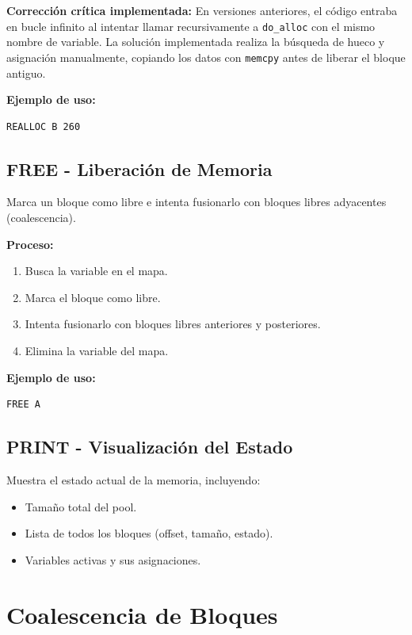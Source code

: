 \documentclass[12pt,a4paper]{article}
\begin{document}
\textbf{Corrección crítica implementada:}
En versiones anteriores, el código entraba en bucle infinito al intentar llamar recursivamente a \texttt{do\_alloc} con el mismo nombre de variable. La solución implementada realiza la búsqueda de hueco y asignación manualmente, copiando los datos con \texttt{memcpy} antes de liberar el bloque antiguo.

\textbf{Ejemplo de uso:}
\begin{lstlisting}
REALLOC B 260
\end{lstlisting}

\subsection{FREE - Liberación de Memoria}

Marca un bloque como libre e intenta fusionarlo con bloques libres adyacentes (coalescencia).

\textbf{Proceso:}
\begin{enumerate}
    \item Busca la variable en el mapa.
    \item Marca el bloque como libre.
    \item Intenta fusionarlo con bloques libres anteriores y posteriores.
    \item Elimina la variable del mapa.
\end{enumerate}

\textbf{Ejemplo de uso:}
\begin{lstlisting}
FREE A
\end{lstlisting}

\subsection{PRINT - Visualización del Estado}

Muestra el estado actual de la memoria, incluyendo:
\begin{itemize}
    \item Tamaño total del pool.
    \item Lista de todos los bloques (offset, tamaño, estado).
    \item Variables activas y sus asignaciones.
\end{itemize}

\section{Coalescencia de Bloques}
\end{document}
